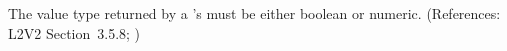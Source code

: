 The value type returned by a \FunctionDefinition's  must be
either boolean or numeric.  (References: L2V2 Section~3.5.8;
)
